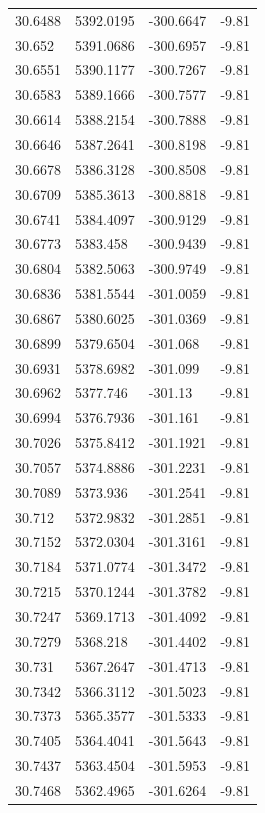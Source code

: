 \begin{table}[H]
\begin{tabular}{llll}
30.6488 & 5392.0195 & -300.6647 & -9.81 \\
30.652 & 5391.0686 & -300.6957 & -9.81 \\
30.6551 & 5390.1177 & -300.7267 & -9.81 \\
30.6583 & 5389.1666 & -300.7577 & -9.81 \\
30.6614 & 5388.2154 & -300.7888 & -9.81 \\
30.6646 & 5387.2641 & -300.8198 & -9.81 \\
30.6678 & 5386.3128 & -300.8508 & -9.81 \\
30.6709 & 5385.3613 & -300.8818 & -9.81 \\
30.6741 & 5384.4097 & -300.9129 & -9.81 \\
30.6773 & 5383.458 & -300.9439 & -9.81 \\
30.6804 & 5382.5063 & -300.9749 & -9.81 \\
30.6836 & 5381.5544 & -301.0059 & -9.81 \\
30.6867 & 5380.6025 & -301.0369 & -9.81 \\
30.6899 & 5379.6504 & -301.068 & -9.81 \\
30.6931 & 5378.6982 & -301.099 & -9.81 \\
30.6962 & 5377.746 & -301.13 & -9.81 \\
30.6994 & 5376.7936 & -301.161 & -9.81 \\
30.7026 & 5375.8412 & -301.1921 & -9.81 \\
30.7057 & 5374.8886 & -301.2231 & -9.81 \\
30.7089 & 5373.936 & -301.2541 & -9.81 \\
30.712 & 5372.9832 & -301.2851 & -9.81 \\
30.7152 & 5372.0304 & -301.3161 & -9.81 \\
30.7184 & 5371.0774 & -301.3472 & -9.81 \\
30.7215 & 5370.1244 & -301.3782 & -9.81 \\
30.7247 & 5369.1713 & -301.4092 & -9.81 \\
30.7279 & 5368.218 & -301.4402 & -9.81 \\
30.731 & 5367.2647 & -301.4713 & -9.81 \\
30.7342 & 5366.3112 & -301.5023 & -9.81 \\
30.7373 & 5365.3577 & -301.5333 & -9.81 \\
30.7405 & 5364.4041 & -301.5643 & -9.81 \\
30.7437 & 5363.4504 & -301.5953 & -9.81 \\
30.7468 & 5362.4965 & -301.6264 & -9.81 \\

\end{tabular}
\end{table}
